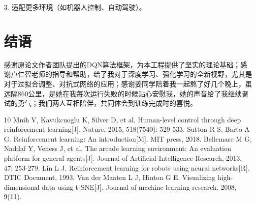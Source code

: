 \documentclass[conference]{IEEEtran}
\begin{document}
	3. 适配更多环境（如机器人控制、自动驾驶）。
	
	\section{结语}
	感谢原论文作者团队提出的DQN算法框架，为本工程提供了坚实的理论基础；感谢卢仁智老师的指导和帮助，给了我对于深度学习、强化学习的全新视野，尤其是对于过拟合调整、对抗式网络的应用；感谢姜同学陪着我一起熬了好几个晚上，虽远隔860公里，是她在我每次运行失败的时候贴心安慰我，她的声音给了我继续调试的勇气；我们两人互相陪伴，共同体会到训练完成时的喜悦。
	
	\balance %
	
	\begin{thebibliography}{10}
		 Mnih V, Kavukcuoglu K, Silver D, et al. Human-level control through deep reinforcement learning[J]. Nature, 2015, 518(7540): 529-533.
		 Sutton R S, Barto A G. Reinforcement learning: An introduction[M]. MIT press, 2018.
		 Bellemare M G, Naddaf Y, Veness J, et al. The arcade learning environment: An evaluation platform for general agents[J]. Journal of Artificial Intelligence Research, 2013, 47: 253-279.
		 Lin L J. Reinforcement learning for robots using neural networks[R]. DTIC Document, 1993.
		 Van der Maaten L J, Hinton G E. Visualizing high-dimensional data using t-SNE[J]. Journal of machine learning research, 2008, 9(11).
	\end{thebibliography}
	
\end{document}
